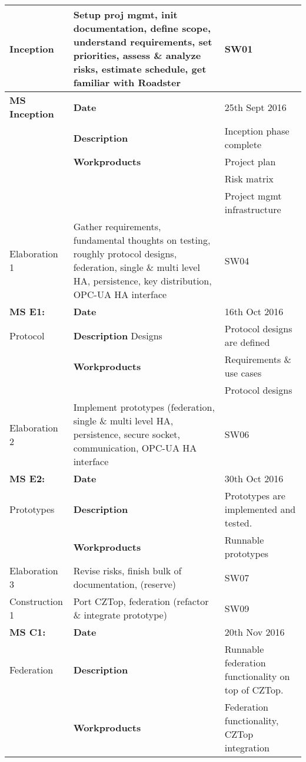 \begin{center}
\begin{longtable}{ | p{25mm} | p{25mm} p{35mm}| p{5mm} | }
    \hline
    \endlastfoot
	Inception
	& \multicolumn{2}{p{70mm}|}{Setup proj mgmt, init documentation, define scope, understand requirements,
	set priorities, assess \& analyze risks, estimate schedule, get familiar with Roadster}
	& SW01 \\ \hline
	  \textbf{MS Inception}
	& \textbf{Date}
	& \multicolumn{2}{l|}{25th Sept 2016} \\
	& \textbf{Description}
	& \multicolumn{2}{l|}{Inception phase complete} \\
	& \textbf{Workproducts}
	& \multicolumn{2}{l|}{Project plan} \\
	& & \multicolumn{2}{l|}{Risk matrix} \\
	& & \multicolumn{2}{l|}{Project mgmt infrastructure} \\
	\hline
	\hline
	Elaboration 1
	& \multicolumn{2}{p{70mm}|}{Gather requirements, fundamental thoughts on testing, roughly protocol designs,
	federation, single \& multi level HA, persistence, key distribution, OPC-UA HA interface}
	& SW04 \\ \hline
	  \textbf{MS E1:}
	& \textbf{Date}
	& \multicolumn{2}{l|}{16th Oct 2016} \\
	Protocol & \textbf{Description}
	Designs & \multicolumn{2}{l|}{Protocol designs are defined} \\
	& \textbf{Workproducts}
	& \multicolumn{2}{l|}{Requirements \& use cases} \\
	&
	& \multicolumn{2}{l|}{Protocol designs} \\ \hline
	Elaboration 2
	& \multicolumn{2}{p{70mm}|}{Implement prototypes (federation, single \& multi level HA, persistence, secure socket,
	communication, OPC-UA HA interface}
	& SW06 \\ \hline
	  \textbf{MS E2:}
	& \textbf{Date}
	& \multicolumn{2}{l|}{30th Oct 2016} \\
	Prototypes & \textbf{Description}
	& \multicolumn{2}{l|}{Prototypes are implemented and tested.} \\
	& \textbf{Workproducts}
	& \multicolumn{2}{l|}{Runnable prototypes} \\
	  \hline
	  \hline
	Elaboration 3
	& \multicolumn{2}{p{70mm}|}{Revise risks, finish bulk of documentation, (reserve)}
	& SW07 \\ \hline
	Construction 1
	& \multicolumn{2}{p{70mm}|}{Port CZTop, federation (refactor \& integrate prototype)}
	& SW09 \\ \hline
	\textbf{MS C1:}
	& \textbf{Date}
	& \multicolumn{2}{l|}{20th Nov 2016} \\
	Federation & \textbf{Description}
	& \multicolumn{2}{l|}{Runnable federation functionality on top of CZTop.} \\
	& \textbf{Workproducts}
	& \multicolumn{2}{l|}{Federation functionality, CZTop integration} \\
	\hline
	\hline


\end{longtable}
\end{center}
